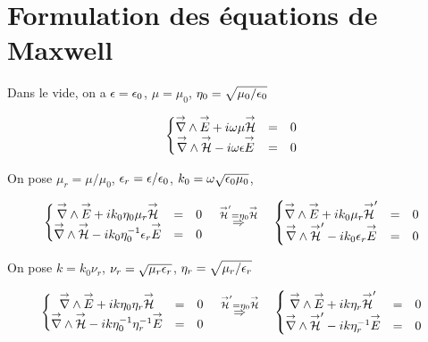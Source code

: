 \section{Formulation des équations de Maxwell}

Dans le vide, on a $\eps=\eps_0$, $\mu=\mu_0$, $\eta_0 = \sqrt{\mu_0 \slash \eps_0}$

\begin{equation}
\left\lbrace \begin{matrix}
\vrot \vE + i\w\mu \vH &=& 0 \\
\vrot \vH - i\w\eps \vE &=& 0 \\
\end{matrix} \right.
\end{equation}

On pose $\mu_r = \mu \slash \mu_0$, $\eps_r = \eps \slash \eps_0$, $k_0 = \w \sqrt {\eps_0\mu_0}$,

\begin{equation}
\left\lbrace \begin{matrix}
\vrot \vE + ik_0\eta_0\mu_r \vH &=& 0 \\
\vrot \vH - ik_0\eta_0^{-1}\eps_r \vE &=& 0 \\
\end{matrix} \right.
\quad
\overset{\vH' = \eta_0 \vH}{\Rightarrow}
\quad
\left\lbrace \begin{matrix}
\vrot \vE + ik_0\mu_r \vH' &=& 0 \\
\vrot \vH' - ik_0\eps_r \vE &=& 0 \\
\end{matrix} \right.
\end{equation}

On pose $k=k_0\nu_r$, $\nu_r = \sqrt{\mu_r\eps_r}$, $\eta_r = \sqrt{\mu_r \slash \eps_r}$

\begin{equation}
\left\lbrace \begin{matrix}
\vrot \vE + ik\eta_0\eta_r \vH &=& 0 \\
\vrot \vH - ik\eta_0^{-1}\eta_r^{-1} \vE &=& 0 \\
\end{matrix} \right.
\quad
\overset{\vH' = \eta_0 \vH}{\Rightarrow}
\quad
\left\lbrace \begin{matrix}
\vrot \vE + ik\eta_r \vH' &=& 0 \\
\vrot \vH' - ik\eta_r^{-1} \vE &=& 0 \\
\end{matrix} \right.
\end{equation}